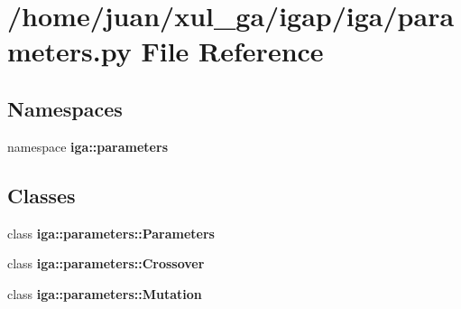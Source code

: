 \section{/home/juan/xul\_\-ga/igap/iga/parameters.py File Reference}
\label{parameters_8py}
\subsection*{Namespaces}
\begin{CompactItemize}
\item 
namespace {\bf iga::parameters}
\end{CompactItemize}
\subsection*{Classes}
\begin{CompactItemize}
\item 
class {\bf iga::parameters::Parameters}
\item 
class {\bf iga::parameters::Crossover}
\item 
class {\bf iga::parameters::Mutation}
\end{CompactItemize}
